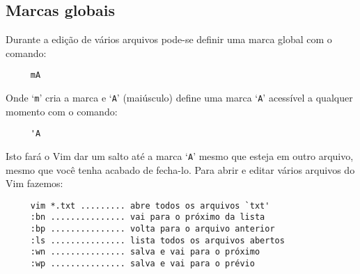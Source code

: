 \subsection{Marcas globais}

Durante a edição de vários arquivos pode-se definir uma marca global com o
comando:

\begin{verbatim}
     mA
\end{verbatim}

Onde `{\tt m}' cria a marca e `{\tt A}' (maiúsculo) define uma marca `{\tt A}'
acessível a qualquer momento com o comando:

\begin{verbatim}
     'A
\end{verbatim}

Isto fará o Vim dar um salto até a marca `{\tt A}' mesmo que esteja em outro arquivo,
mesmo que você tenha acabado de fecha-lo. Para abrir e editar vários arquivos
do Vim fazemos:

\begin{verbatim}
     vim *.txt ......... abre todos os arquivos `txt'
     :bn ............... vai para o próximo da lista
     :bp ............... volta para o arquivo anterior
     :ls ............... lista todos os arquivos abertos
     :wn ............... salva e vai para o próximo
     :wp ............... salva e vai para o prévio
\end{verbatim}

% 
% 
% 
% 
